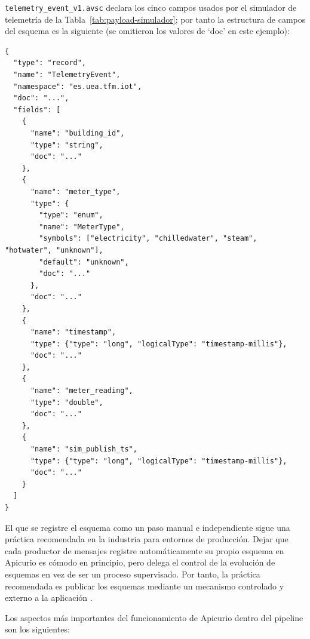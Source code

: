 \texttt{telemetry\_event\_v1.avsc} declara los cinco campos usados por el simulador de telemetría de la Tabla~\ref{tab:payload-simulador}; por tanto la estructura de campos del esquema es la siguiente (se omitieron los valores de `doc' en este ejemplo):

{\footnotesize
\begin{verbatim}
{
  "type": "record",
  "name": "TelemetryEvent",
  "namespace": "es.uea.tfm.iot",
  "doc": "...",
  "fields": [
    {
      "name": "building_id",
      "type": "string",
      "doc": "..."
    },
    {
      "name": "meter_type",
      "type": {
        "type": "enum",
        "name": "MeterType",
        "symbols": ["electricity", "chilledwater", "steam", "hotwater", "unknown"],
        "default": "unknown",
        "doc": "..."
      },
      "doc": "..."
    },
    {
      "name": "timestamp",
      "type": {"type": "long", "logicalType": "timestamp-millis"},
      "doc": "..."
    },
    {
      "name": "meter_reading",
      "type": "double",
      "doc": "..."
    },
    {
      "name": "sim_publish_ts",
      "type": {"type": "long", "logicalType": "timestamp-millis"},
      "doc": "..."
    }
  ]
}
\end{verbatim}
}

El que se registre el esquema como un paso manual e independiente sigue una práctica recomendada en la industria para entornos de producción. Dejar que cada productor de mensajes registre automáticamente su propio esquema en Apicurio es cómodo en principio, pero delega el control de la evolución de esquemas en vez de ser un proceso supervisado. Por tanto, la práctica recomendada es publicar los esquemas mediante un mecanismo controlado y externo a la aplicación \cite{yokota2024}.

Los aspectos más importantes del funcionamiento de Apicurio dentro del pipeline son los siguientes:


